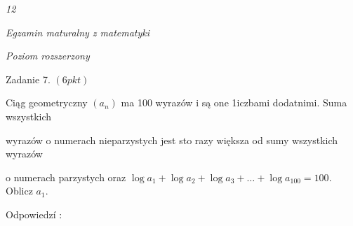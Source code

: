 \documentclass[a4paper,12pt]{article}
\begin{document}
{\it 12}

{\it Egzamin maturalny z matematyki}

{\it Poziom rozszerzony}

Zadanie 7. $(6pkt)$

Ciąg geometryczny $(a_{n})$ ma 100 wyrazów i są one 1iczbami dodatnimi. Suma wszystkich

wyrazów o numerach nieparzystych jest sto razy większa od sumy wszystkich wyrazów

o numerach parzystych oraz $\log a_{1}+\log a_{2}+\log a_{3}+\ldots+\log a_{100}=100$. Oblicz $a_{1}.$

Odpowiedzí :
\end{document}
